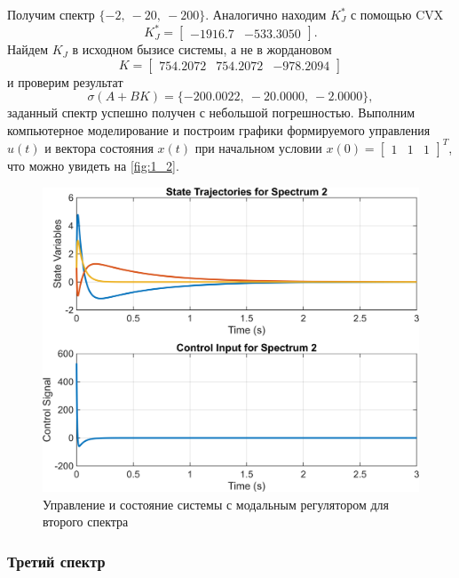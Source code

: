 Получим спектр $\{-2,\ -20,\ -200\}$. Аналогично находим $K_J^*$ с помощью CVX
\begin{equation*}
    K_J^*=\begin{bmatrix}
        -1916.7&	-533.3050
    \end{bmatrix}.
\end{equation*}
Найдем $K_J$ в исходном бызисе
системы, а не в жордановом
\begin{equation*}
    K=\begin{bmatrix}
        754.2072&	754.2072&	-978.2094
    \end{bmatrix}
\end{equation*}
и проверим результат
\begin{equation*}
    \sigma(A+BK)=\{-200.0022,\ 
    -20.0000,\ 
    -2.0000\},
\end{equation*}
заданный спектр успешно получен с небольшой погрешностью. 
Выполним компьютерное моделирование и построим графики 
формируемого управления $u(t)$ и вектора 
состояния $x(t)$ при начальном условии 
$x(0) =\begin{bmatrix}
    1 & 1 & 1
\end{bmatrix}^T$, что можно увидеть на \autoref{fig:1_2}.

\begin{figure}[H]
    \centering
    \includegraphics[width=0.9\linewidth]{figs/task1_2.png}
    \caption{Управление и состояние системы с модальным регулятором для второго спектра}
    \label{fig:1_2}
\end{figure}

\subsubsection{Третий спектр}

